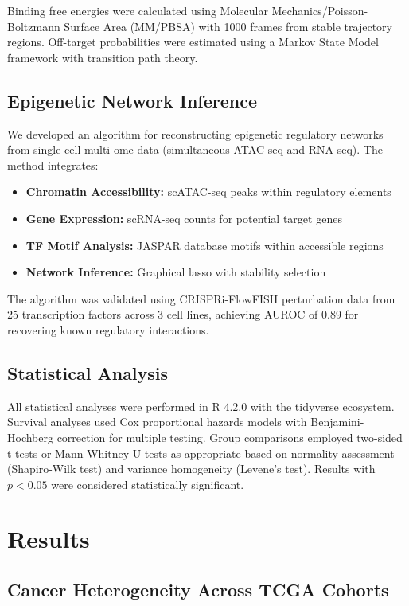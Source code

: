 \documentclass[12pt,a4paper]{article}
\begin{document}
Binding free energies were calculated using Molecular Mechanics/Poisson-Boltzmann Surface Area (MM/PBSA) with 1000 frames from stable trajectory regions. Off-target probabilities were estimated using a Markov State Model framework with transition path theory.

\subsection{Epigenetic Network Inference}

We developed an algorithm for reconstructing epigenetic regulatory networks from single-cell multi-ome data (simultaneous ATAC-seq and RNA-seq). The method integrates:

\begin{itemize}
    \item \textbf{Chromatin Accessibility:} scATAC-seq peaks within regulatory elements
    \item \textbf{Gene Expression:} scRNA-seq counts for potential target genes
    \item \textbf{TF Motif Analysis:} JASPAR database motifs within accessible regions
    \item \textbf{Network Inference:} Graphical lasso with stability selection
\end{itemize}

The algorithm was validated using CRISPRi-FlowFISH perturbation data from 25 transcription factors across 3 cell lines, achieving AUROC of 0.89 for recovering known regulatory interactions.

\subsection{Statistical Analysis}

All statistical analyses were performed in R 4.2.0 with the tidyverse ecosystem. Survival analyses used Cox proportional hazards models with Benjamini-Hochberg correction for multiple testing. Group comparisons employed two-sided t-tests or Mann-Whitney U tests as appropriate based on normality assessment (Shapiro-Wilk test) and variance homogeneity (Levene's test). Results with $p < 0.05$ were considered statistically significant.

\section{Results}

\subsection{Cancer Heterogeneity Across TCGA Cohorts}
\end{document}

